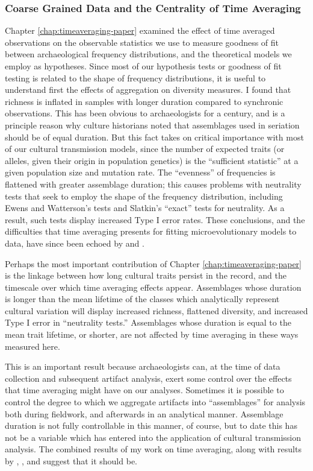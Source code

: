 \subsubsection{Coarse Grained Data and the Centrality of Time Averaging}\label{conc:sec:conc-timeaveraging}

Chapter \ref{chap:timeaveraging-paper} examined the effect of time averaged observations on the observable statistics we use to measure goodness of fit between archaeological frequency distributions, and the theoretical models we employ as hypotheses.  Since most of our hypothesis tests or goodness of fit testing is related to the shape of frequency distributions, it is useful to understand first the effects of aggregation on diversity measures.  I found that richness is inflated in samples with longer duration compared to synchronic observations.  This has been obvious to archaeologists for a century, and is a principle reason why culture historians noted that assemblages used in seriation should be of equal duration.  But this fact takes on critical importance with most of our cultural transmission models, since the number of expected traits (or alleles, given their origin in population genetics) is the ``sufficient statistic'' at a given population size and mutation rate.  The ``evenness'' of frequencies is flattened with greater assemblage duration; this causes problems with neutrality tests that seek to employ the shape of the frequency distribution, including Ewens and Watterson's tests and Slatkin's ``exact'' tests for neutrality.  As a result, such tests display increased Type I error rates.  These conclusions, and the difficulties that time averaging presents for fitting microevolutionary models to data, have since been echoed by \citet{Premo2014} and \citet{perreault2018time}.  

Perhaps the most important contribution of Chapter \ref{chap:timeaveraging-paper} is the linkage between how long cultural traits persist in the record, and the timescale over which time averaging effects appear.  Assemblages whose duration is longer than the mean lifetime of the classes which analytically represent cultural variation will display increased richness, flattened diversity, and increased Type I error in ``neutrality tests.''  Assemblages whose duration is equal to the mean trait lifetime, or shorter, are not affected by time averaging in these ways measured here.  

This is an important result because archaeologists can, at the time of data collection and subsequent artifact analysis, exert some control over the effects that time averaging might have on our analyses.  Sometimes it is possible to control the degree to which we aggregate artifacts into ``assemblages'' for analysis both during fieldwork, and afterwards in an analytical manner.  Assemblage duration is not fully controllable in this manner, of course, but to date this has not be a variable which has entered into the application of cultural transmission analysis.  The combined results of my work on time averaging, along with results by \citet{Premo2014}, \citet{Porvcic2014}, and \citep{perreault2018time,perreault2019quality} suggest that it should be.

